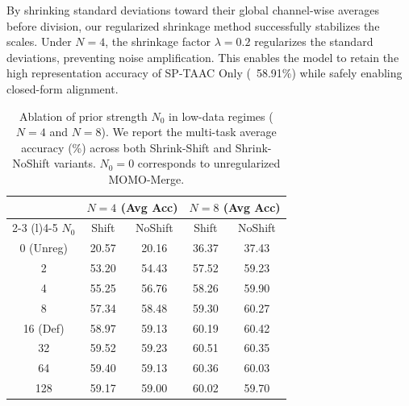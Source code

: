 \documentclass{article}
\theoremstyle{plain}
\theoremstyle{definition}
\theoremstyle{remark}
\begin{document}
By shrinking standard deviations toward their global channel-wise averages before division, our regularized shrinkage method successfully stabilizes the scales. Under $N=4$, the shrinkage factor $\lambda = 0.2$ regularizes the standard deviations, preventing noise amplification. This enables the model to retain the high representation accuracy of SP-TAAC Only (~58.91\%) while safely enabling closed-form alignment.

\begin{table}[ht]
\caption{Ablation of prior strength $N_0$ in low-data regimes ($N=4$ and $N=8$). We report the multi-task average accuracy (\%) across both Shrink-Shift and Shrink-NoShift variants. $N_0=0$ corresponds to unregularized MOMO-Merge.}
\label{tab:ablation_n0}
\vskip 0.15in
\begin{center}
\begin{small}
\begin{sc}
\begin{tabular}{ccccc}
\toprule
 & \multicolumn{2}{c}{$N=4$ (Avg Acc)} & \multicolumn{2}{c}{$N=8$ (Avg Acc)} \\
\cmidrule(r){2-3} \cmidrule(l){4-5}
$N_0$ & Shift & NoShift & Shift & NoShift \\
\midrule
0 (Unreg) & 20.57 & 20.16 & 36.37 & 37.43 \\
2         & 53.20 & 54.43 & 57.52 & 59.23 \\
4         & 55.25 & 56.76 & 58.26 & 59.90 \\
8         & 57.34 & 58.48 & 59.30 & 60.27 \\
16 (Def)  & 58.97 & 59.13 & 60.19 & 60.42 \\
32        & 59.52 & 59.23 & 60.51 & 60.35 \\
64        & 59.40 & 59.13 & 60.36 & 60.03 \\
128       & 59.17 & 59.00 & 60.02 & 59.70 \\
\bottomrule
\end{tabular}
\end{sc}
\end{small}
\end{center}
\vskip -0.1in
\end{table}
\end{document}
